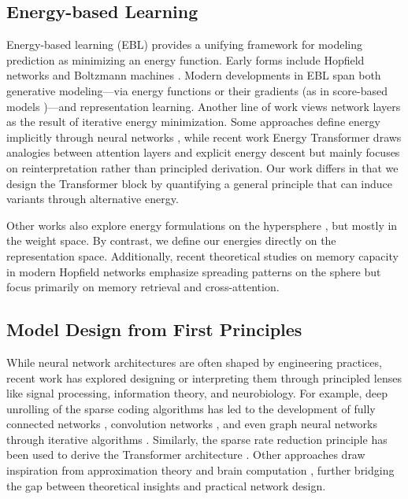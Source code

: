 \subsection{Energy-based Learning}
Energy-based learning (EBL) \citep{lecun2006tutorial,dawid2024introduction} provides a unifying framework for modeling prediction as minimizing an energy function. Early forms include Hopfield networks \citep{hopfield1982neural} and Boltzmann machines \citep{ackley1985learning}. Modern developments in EBL span both generative modeling—via energy functions \citep{du2019implicit} or their gradients (as in score-based models \citep{pmlr-v37-sohl-dickstein15,song2019generative})—and representation learning. Another line of work views network layers as the result of iterative energy minimization. Some approaches define energy implicitly through neural networks \citep{bai2019deep,du2022learning, Du_2024_ICML}, while recent work Energy Transformer \citep{hoover2024energy} draws analogies between attention layers and explicit energy descent but mainly focuses on reinterpretation rather than principled derivation. Our work differs in that we design the Transformer block by quantifying a general principle that can induce variants through alternative energy.

Other works also explore energy formulations on the hypersphere \citep{liu2018learning,loshchilov2025ngpt}, but mostly in the weight space. By contrast, we define our energies directly on the representation space. Additionally, recent theoretical studies on memory capacity in modern Hopfield networks \citep{hu2024computational,pmlr-v235-wu24i,hu2024provably} emphasize spreading patterns on the sphere but focus primarily on memory retrieval and cross-attention. 

\subsection{Model Design from First Principles}
While neural network architectures are often shaped by engineering practices, recent work has explored designing or interpreting them through principled lenses like signal processing, information theory, and neurobiology. For example, deep unrolling of the sparse coding algorithms has led to the development of fully connected networks \citep{gregor2010learning}, convolution networks \citep{papyan2017convolutional, papyan2018theoretical}, and even graph neural networks through iterative algorithms \citep{yang2021graph}. Similarly, the sparse rate reduction principle has been used to derive the Transformer architecture \citep{yu2023white}. Other approaches draw inspiration from approximation theory \citep{liu2025kan} and brain computation \citep{kozachkov2023building}, further bridging the gap between theoretical insights and practical network design. 

